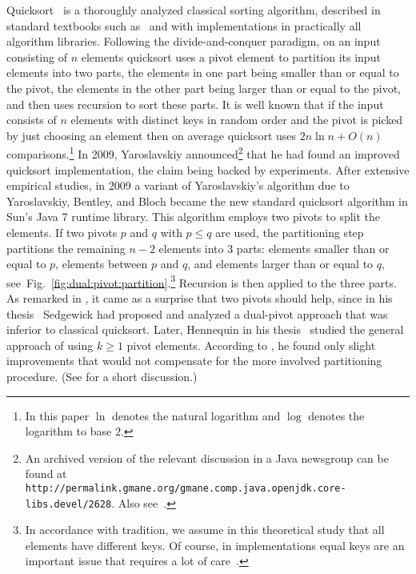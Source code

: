 \documentclass[prodmode,acmtalg]{acmsmall}
\begin{document}
Quicksort~\cite{Hoare} is a thoroughly analyzed classical sorting algorithm,
described in standard textbooks such as~\cite{CLRS,Knuth,FlajSedg} 
and with implementations in practically all algorithm libraries. 
Following the divide-and-conquer paradigm, on an input consisting of $n$ elements
quicksort uses a pivot element to 
partition its input elements into two parts, 
the elements in one part being smaller than or equal to the pivot, the elements in the other 
part being larger than or equal to the pivot, and then uses recursion to sort these parts. 
It is well known that if the input consists of
$n$ elements with distinct keys in random order and the pivot is picked by just
choosing an element then on average quicksort uses $2n\ln n + O(n)$ comparisons.\footnote{
In this paper $\ln$ denotes the natural logarithm and $\log$ denotes the logarithm to base $2$.}
In 2009, Yaroslavskiy announced\footnote{An archived version of the relevant discussion in a Java newsgroup can be found at\\
    \texttt{http://permalink.gmane.org/gmane.comp.java.openjdk.core-libs.devel/2628}. Also see~\cite{nebel12}.} 
that he had found an improved quicksort implementation, the claim being backed by experiments. 
After extensive empirical studies, in 2009 a variant of Yaroslavskiy's
algorithm due to Yaroslavskiy, Bentley, and Bloch became the new standard quicksort algorithm in Sun's Java 7 runtime library. 
This algorithm employs two pivots to split the elements.
If two pivots $p$ and $q$ with $p \leq q$ are used, 
the partitioning step partitions the remaining $n-2$ elements into 3 parts:
elements smaller than or equal to $p$, 
elements between $p$ and $q$, and elements larger than or equal to $q$,
see~Fig.~\ref{fig:dual:pivot:partition}.\footnote{In accordance with tradition, we assume in this theoretical study that all elements have different keys. 
Of course, in implementations equal keys are an important issue that requires a lot of care~\cite{SedgewickEqual}.}
Recursion is then applied to the three parts.
As remarked in \cite{nebel12}, it came as a surprise that two pivots should help, since in his thesis~\cite{sedgewick}
Sedgewick had proposed and analyzed  a dual-pivot
approach that was inferior to classical quicksort. Later, Hennequin in his
thesis~\cite{hennequin}
studied the general approach of using $k \geq 1$ pivot elements. According to \cite{nebel12}, he found only
slight improvements that would not compensate for the more involved partitioning procedure. 
(See \cite{nebel12} for a short discussion.)
\end{document}
